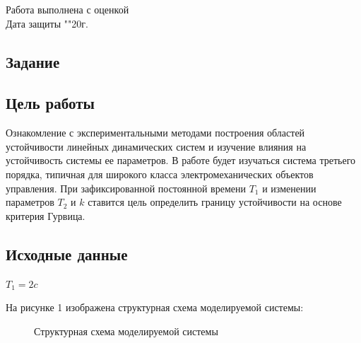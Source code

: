 \documentclass[a4paper, 11pt]{article}
\begin{document}
\begin{titlepage}
		Работа выполнена с оценкой \hspace{1cm} \underline{\hspace{8cm}} \\ 
		\vspace{1cm}
		Дата защиты "\underline{\hspace{0.7cm}}"\hspace{0.2cm}\underline{\hspace{2cm}}\hspace{0.2cm}20\underline{\hspace{0.7cm}}г.

\end{titlepage}

\begin{center}
\section*{Задание}
\end{center}

\subsection*{Цель работы} 
Ознакомление с экспериментальными методами построения областей устойчивости линейных динамических систем и изучение влияния на устойчивость системы ее параметров. В работе будет изучаться система третьего порядка, типичная для широкого класса электромеханических объектов управления. При зафиксированной постоянной времени $T_1$ и изменении параметров $T_2$ и $k$ ставится цель определить границу устойчивости на основе критерия Гурвица.

\subsection*{Исходные данные}
\par
$T_1 = 2 c$
\par
На рисунке 1 изображена структурная схема моделируемой системы:
\begin{figure}[h]
\caption{Структурная схема моделируемой системы}
\label{ris:image}
\end{figure}
\end{document}
